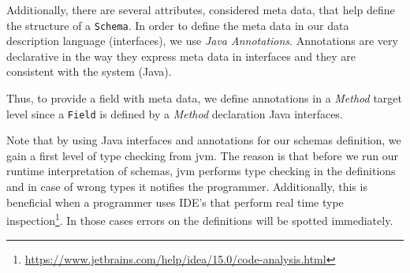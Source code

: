 Additionally, there are several attributes, considered meta data, that help define the structure of a \texttt{Schema}.
In order to define the meta data in our data description language (interfaces), we use \textit{Java Annotations}.
Annotations are very declarative in the way they express meta data in interfaces and they are consistent with the system (Java).

Thus, to provide a field with meta data, we define annotations in a \textit{Method} target level since a \texttt{Field} is defined by a \textit{Method} declaration Java interfaces.

Note that by using Java interfaces and annotations for our schemas definition, we gain a first level of type checking from \ac{jvm}. 
The reason is that before we run our runtime interpretation of schemas, \ac{jvm} performs type checking in the definitions and in case of wrong types it notifies the programmer.
Additionally, this is beneficial when a programmer uses IDE's that perform real time type inspection\footnote{\url{https://www.jetbrains.com/help/idea/15.0/code-analysis.html}}. 
In those cases errors on the definitions will be spotted immediately. 

